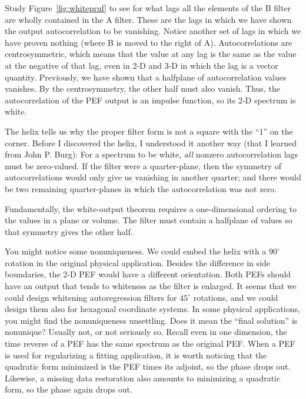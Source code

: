 \par
Study Figure~\ref{fig:whitepruf} to see for what lags
all the elements of the B filter are wholly contained in the A filter.
These are the lags
in which we have shown the output autocorrelation to be vanishing.
Notice another set of lags in which we have proven nothing
(where B is moved to the right of A).
Autocorrelations are centrosymmetric,
which means that the value at any lag
is the same as the value at the negative of that lag,
even in 2-D and 3-D in which the lag is a vector quantity.
Previously, we have shown that a halfplane of autocorrelation values vanishes.
By the centrosymmetry, the other half must also vanish.
Thus,
the autocorrelation of the PEF output is an impulse function,
so its 2-D spectrum is white.

\par
The helix tells us why the proper filter form
is not a square with the ``1'' on the corner.
Before I discovered the helix, I understood it another way
(that I learned from John P. Burg):
For a spectrum to be white,
{\it all}
nonzero autocorrelation lags must be zero-valued.
If the filter were a quarter-plane,
then the symmetry of autocorrelations
would only give us vanishing in another quarter;
and there would be two remaining quarter-planes in which the autocorrelation was not zero.

\par
Fundamentally,
the white-output theorem requires a
one-dimensional ordering to the values in a plane or volume.
The filter must contain a halfplane of values
so that symmetry gives the other half.

\par
You might notice some nonuniqueness.
We could embed the helix
with a $90^\circ$ rotation
in the original physical application.
Besides the difference in side boundaries,
the 2-D PEF would have a different orientation.
Both PEFs should have an output that tends to whiteness as
the filter is enlarged.
It seems that we could design whitening autoregression filters
for $45^\circ$ rotations,
and we could design them also for hexagonal coordinate systems.
In some physical applications,
you might find the nonuniqueness unsettling.
Does it mean the ``final solution'' is nonunique?
Usually not, or not seriously so.
Recall even in one dimension, the time reverse of a PEF
has the same spectrum as the original PEF.
When a PEF is used for regularizing a fitting application,
it is worth noticing that the quadratic form minimized
is the PEF times its adjoint, so the phase drops out.
Likewise, a missing data restoration also amounts to minimizing
a quadratic form, so the phase again drops out.

